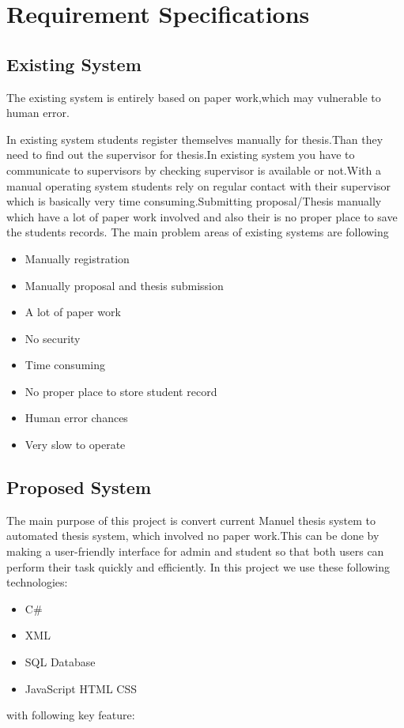 \chapter{Requirement Specifications} \label{chap:reqs}


\section*{}
\section{Existing System}
	The existing system is entirely based on paper work,which may vulnerable to human error.
	\par In existing system students register themselves manually for thesis.Than they need to find out the supervisor for thesis.In existing system you have to communicate to supervisors by checking supervisor is available or not.With a manual operating system students rely on regular contact with their supervisor which is basically very time consuming.Submitting proposal/Thesis manually which have a lot of paper work involved and also their is no proper place to save the students records. 
The main problem areas of existing systems are following
\begin{itemize}






       \item Manually registration
       \item Manually proposal and thesis submission
       \item A lot of paper work
       \item No security
       \item Time consuming
       \item No proper place to store student record
       \item Human error chances 
       \item Very slow to operate 
      \end{itemize}
       
	
	\section{Proposed System}
	The main purpose of this project is convert current Manuel thesis system to automated thesis system, which involved no paper work.This can be done by making a user-friendly interface for admin and student so that both users can perform their task quickly and efficiently. 
	In this project we use these following technologies:
	\begin{itemize}
		\item C\#
		\item XML
		\item SQL Database 
	\item JavaScript HTML CSS
	\end{itemize}
	with following key feature:
	
